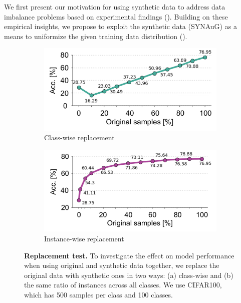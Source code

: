 We first present our motivation for using synthetic data to address data imbalance problems based on experimental findings ().
Building on these empirical insights, we propose to exploit the synthetic data (SYNAuG) as a means to uniformize the given training data distribution 
().

\begin{figure}
    \centering
        \begin{subfigure}[b]{0.9\linewidth}
        \centering
        \includegraphics[width=1.0\linewidth]{figures/example1.pdf}
        \caption{Class-wise replacement}
        \label{fig:classwise}
    \end{subfigure}
    \centering
        \begin{subfigure}[b]{0.9\linewidth}
        \centering
        \includegraphics[width=1.0\linewidth]{figures/example2.pdf}
        \caption{Instance-wise replacement}
        \label{fig:instwise}
    \end{subfigure}    
    \caption{\textbf{Replacement test.} 
    To investigate the effect on model performance when using original and synthetic data together, we replace the original data with synthetic ones in two ways: (a) class-wise and (b) the same ratio of instances across all classes.
    We use CIFAR100, which has 500 samples per class and 100 classes.
    }
    \label{fig:abl_ratio}
\end{figure}

